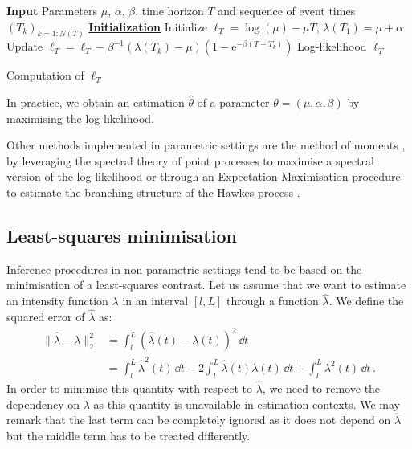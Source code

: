 \begin{algorithm}[!ht]
    \SetAlgoLined
     \textbf{Input} Parameters $\mu$, $\alpha$, $\beta$, time horizon $T$ and sequence of event times $(T_k)_{k=1:N(T)}$\;
     \textbf{\underline{Initialization}} Initialize $\ell_T = \log(\mu) - \mu T$, $\lambda(T_1) = \mu + \alpha$\;
    Update $\ell_T = \ell_T - \beta^{-1}(\lambda(T_k) - \mu)(1 - \mathrm{e}^{-\beta(T - T_k)})$\;
     \Return Log-likelihood $\ell_T$
     \caption{Computation of $\ell_T$}
     \label{alg:chap_1_loglikelihood}
\end{algorithm}

In practice, we obtain an estimation $\hat \theta$ of a parameter $\theta = (\mu, \alpha, \beta)$ by maximising the log-likelihood.

Other methods implemented in parametric settings are the method of moments \parencite{DaFonseca2013}, by leveraging the spectral theory of point processes to maximise a spectral version of the log-likelihood \parencite{Adamopoulos1976} or through an Expectation-Maximisation procedure to estimate the branching structure of the Hawkes process \parencite{Veen2008}.

\subsection{Least-squares minimisation}

Inference procedures in non-parametric settings tend to be based on the minimisation of a least-squares contrast.
Let us assume that we want to estimate an intensity function $\lambda$ in an interval $[l, L]$ through a function $\hat \lambda$.
We define the squared error of $\hat \lambda$ as:
\begin{align}
    \|\hat \lambda - \lambda\|_2^2 &= \int_{l}^{L}{(\hat \lambda(t) - \lambda(t))^2\,\dd t}\\
    &= \int_{l}^{L}{\hat \lambda^2(t)\,\dd t} - 2\int_{l}^{L}{\hat \lambda(t)\lambda(t)\,\dd t} + \int_{l}^{L}{\lambda^2(t)\,\dd t}\,.
\end{align}
In order to minimise this quantity with respect to $\hat \lambda$, we need to remove the dependency on $\lambda$ as this quantity is unavailable in estimation contexts.
We may remark that the last term can be completely ignored as it does not depend on $\hat \lambda$ but the middle term has to be treated differently.

